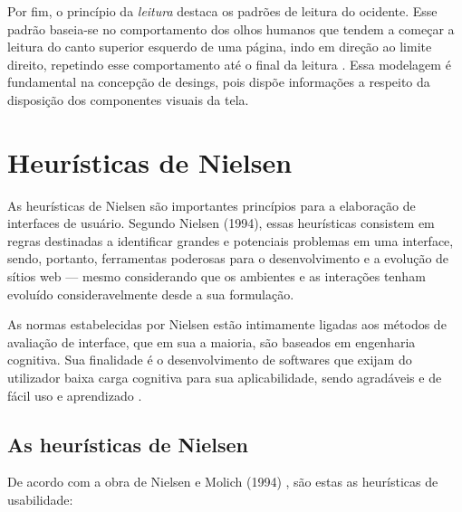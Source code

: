 Por fim, o princípio da \textit{leitura} destaca os padrões de leitura do ocidente. Esse padrão baseia-se no comportamento dos olhos humanos que tendem a começar a leitura do canto superior esquerdo de uma página, indo em direção ao limite direito, repetindo esse comportamento até o final da leitura \cite{lidwell2010}. Essa modelagem é fundamental na concepção de desings, pois dispõe informações a respeito da disposição dos componentes visuais da tela.

\section{Heurísticas de Nielsen}

As heurísticas de Nielsen são importantes princípios para a elaboração de interfaces de usuário. Segundo Nielsen (1994)\cite{nielsen1994usability}, essas heurísticas consistem em regras destinadas a identificar grandes e potenciais problemas em uma interface, sendo, portanto, ferramentas poderosas para o desenvolvimento e a evolução de sítios web — mesmo considerando que os ambientes e as interações tenham evoluído consideravelmente desde a sua formulação.

As normas estabelecidas por Nielsen estão intimamente ligadas aos métodos de avaliação de interface, que em sua a maioria, são baseados em engenharia cognitiva. Sua finalidade é o desenvolvimento de softwares que exijam do utilizador baixa carga cognitiva para sua aplicabilidade, sendo agradáveis e de fácil uso e aprendizado \cite{maciel2004avaliacao}.

\subsection{As heurísticas de Nielsen}

De acordo com a obra de Nielsen e Molich (1994) \cite{nielsen1994usability}, são estas as heurísticas de usabilidade:

